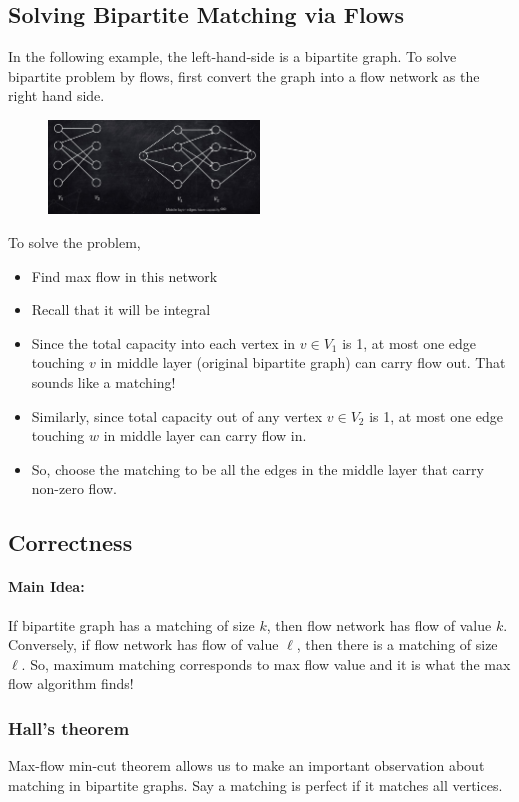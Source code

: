 \subsection{Solving Bipartite Matching via Flows}
In the following example, the left-hand-side is a bipartite graph. To solve bipartite problem by flows, first convert the graph into a flow network as the right hand side.
\begin{figure}[H]
	\centering
	\includegraphics[width=0.5\textwidth]{fig/bipartition.png}
\end{figure} 
To solve the problem,
\begin{itemize}
	\item Find max flow in this network
	\item Recall that it will be integral
	\item Since the total capacity into each vertex in $v \in V_1$ is 1, at most one edge touching $v$ in middle layer (original bipartite graph) can carry flow out. That sounds like a matching!
	\item Similarly, since total capacity out of any vertex $v \in V_2$  is 1, at most one edge touching $w$ in middle layer can carry flow in.
	\item So, choose the matching to be all the edges in the middle layer that carry non-zero flow.
\end{itemize}

\subsection{Correctness}
\paragraph{Main Idea:} If bipartite graph has a matching of size $k$, then flow network has flow of value $k$. Conversely, if flow network has flow of value $\ell$, then there is a matching of size $\ell$. So, maximum matching corresponds to max flow value and it is what the max flow algorithm finds!

\subsubsection{Hall's theorem}
Max-flow min-cut theorem allows us to make an important observation about matching in bipartite graphs. Say a matching is perfect if it matches all vertices.

